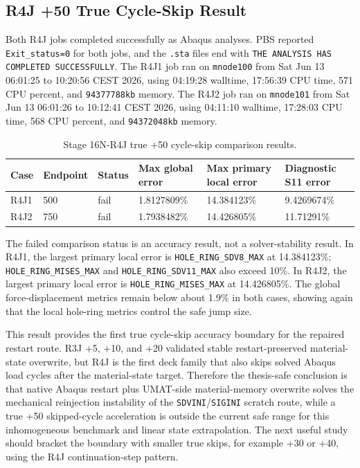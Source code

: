 \documentclass[11pt,a4paper]{article}
\newcommand{\code}[1]{\texttt{#1}}
\begin{document}
\subsection{R4J +50 True Cycle-Skip Result}

Both R4J jobs completed successfully as Abaqus analyses. PBS reported \code{Exit\_status=0} for both jobs, and the \code{.sta} files end with \code{THE ANALYSIS HAS COMPLETED SUCCESSFULLY}. The R4J1 job ran on \code{mnode100} from Sat Jun 13 06:01:25 to 10:20:56 CEST 2026, using 04:19:28 walltime, 17:56:39 CPU time, 571 CPU percent, and \code{94377788kb} memory. The R4J2 job ran on \code{mnode101} from Sat Jun 13 06:01:26 to 10:12:41 CEST 2026, using 04:11:10 walltime, 17:28:03 CPU time, 568 CPU percent, and \code{94372048kb} memory.

\begin{table}[H]
\centering
\caption{Stage 16N-R4J true +50 cycle-skip comparison results.}
\begin{tabular}{llllll}
\toprule
Case & Endpoint & Status & Max global error & Max primary local error & Diagnostic S11 error \\
\midrule
R4J1 & 500 & fail & 1.8127809\% & 14.384123\% & 9.4269674\% \\
R4J2 & 750 & fail & 1.7938482\% & 14.426805\% & 11.71291\% \\
\bottomrule
\end{tabular}
\end{table}

The failed comparison status is an accuracy result, not a solver-stability result. In R4J1, the largest primary local error is \code{HOLE\_RING\_SDV8\_MAX} at 14.384123\%; \code{HOLE\_RING\_MISES\_MAX} and \code{HOLE\_RING\_SDV11\_MAX} also exceed 10\%. In R4J2, the largest primary local error is \code{HOLE\_RING\_MISES\_MAX} at 14.426805\%. The global force-displacement metrics remain below about 1.9\% in both cases, showing again that the local hole-ring metrics control the safe jump size.

This result provides the first true cycle-skip accuracy boundary for the repaired restart route. R3J +5, +10, and +20 validated stable restart-preserved material-state overwrite, but R4J is the first deck family that also skips solved Abaqus load cycles after the material-state target. Therefore the thesis-safe conclusion is that native Abaqus restart plus UMAT-side material-memory overwrite solves the mechanical reinjection instability of the \code{SDVINI}/\code{SIGINI} scratch route, while a true +50 skipped-cycle acceleration is outside the current safe range for this inhomogeneous benchmark and linear state extrapolation. The next useful study should bracket the boundary with smaller true skips, for example +30 or +40, using the R4J continuation-step pattern.
\end{document}
